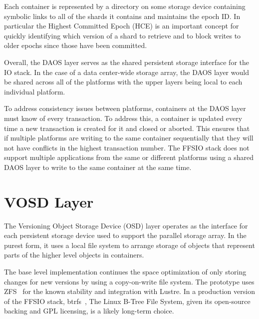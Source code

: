 \documentclass[conference]{IEEEtran}
\begin{document}
Each container is represented by a directory on some storage device containing
symbolic links to all of the shards it contains and maintains the epoch ID.
In particular the Highest Committed Epoch (HCE) is an important concept for
quickly identifying which version of a shard to retrieve and to block writes to
older epochs since those have been committed.


Overall, the DAOS layer serves as the shared persistent storage interface for
the IO stack. In the case of a data center-wide storage array, the DAOS layer
would be shared across all of the platforms with the upper layers being local
to each individual platform.

To address consistency issues between platforms, containers at the DAOS layer
must know of every transaction. To address this, a container is updated every
time a new transaction is created for it and closed or aborted. This ensures
that if multiple platforms are writing to the same container sequentially that
they will not have conflicts in the highest transaction number. The FFSIO stack
does not support multiple applications from the same or different platforms
using a shared DAOS layer to write to the same container at the same time.

\section{VOSD Layer}
\label{sec:vosd}

The Versioning Object Storage Device (OSD) layer operates as the interface for
each persistent storage device used to support the parallel storage array. In
the purest form, it uses a local file system to arrange storage of objects that
represent parts of the higher level objects in containers.

The base level implementation continues the space optimization of only storing
changes for new versions by using a copy-on-write file system. The prototype
uses ZFS~\cite{zhang:2010:zfs} for the known stability and integration with
Lustre. In a production version of the FFSIO stack,
btrfs~\cite{rodeh:2013:btrfs}, The Linux B-Tree File System, given its
open-source backing and GPL licensing, is a likely long-term choice.
\end{document}
